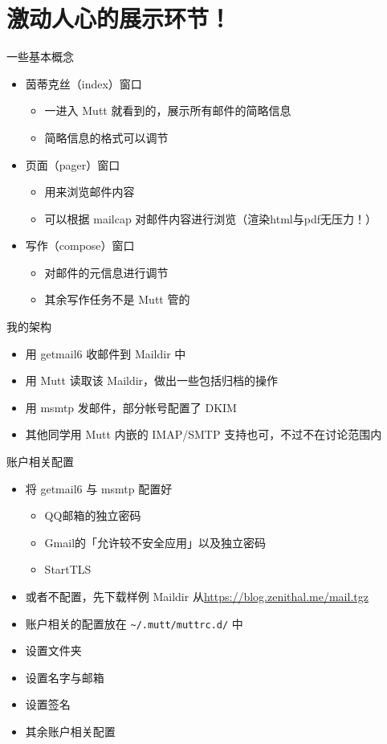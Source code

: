 \documentclass{ctexbeamer}
\newcommand{\T}[1]{\texttt{#1}}
\begin{document}
\section{激动人心的展示环节！}
\begin{frame}{一些基本概念}
  \begin{itemize}
    \item 茵蒂克丝（index）窗口\begin{itemize}
        \item 一进入 Mutt 就看到的，展示所有邮件的简略信息
        \item 简略信息的格式可以调节
      \end{itemize}
    \item 页面（pager）窗口\begin{itemize}
        \item 用来浏览邮件内容
        \item 可以根据 mailcap 对邮件内容进行浏览（渲染html与pdf无压力！）
      \end{itemize}
    \item 写作（compose）窗口\begin{itemize}
        \item 对邮件的元信息进行调节
        \item 其余写作任务不是 Mutt 管的
      \end{itemize}
  \end{itemize}
\end{frame}

\begin{frame}{我的架构}
  \begin{itemize}
    \item 用 getmail6 收邮件到 Maildir 中
    \item 用 Mutt 读取该 Maildir，做出一些包括归档的操作
    \item 用 msmtp 发邮件，部分帐号配置了 DKIM 
    \item 其他同学用 Mutt 内嵌的 IMAP/SMTP 支持也可，不过不在讨论范围内
  \end{itemize}
\end{frame}

\begin{frame}{账户相关配置}
  \begin{itemize}
    \item 将 getmail6 与 msmtp 配置好\begin{itemize}
      \item QQ邮箱的独立密码
      \item Gmail的「允许较不安全应用」以及独立密码
      \item StartTLS
    \end{itemize}
    \item 或者不配置，先下载样例 Maildir 从\url{https://blog.zenithal.me/mail.tgz}
    \item 账户相关的配置放在 \T{\~{}/.mutt/muttrc.d/} 中
    \item 设置文件夹
    \item 设置名字与邮箱
    \item 设置签名
    \item 其余账户相关配置
  \end{itemize}
\end{frame}
\end{document}
